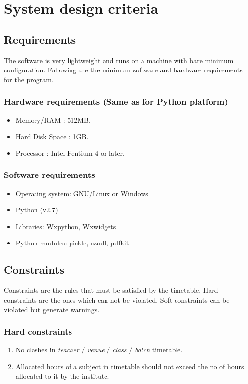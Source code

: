 %

\chapter{System design criteria}
\section{Requirements}
The software is very lightweight and runs on a machine with bare minimum configuration. Following are the minimum software and hardware requirements for the program.
\subsection{Hardware requirements (Same as for Python platform)}
\begin{itemize}
\item Memory/RAM : 512MB.
\item Hard Disk Space : 1GB.
\item Processor : Intel Pentium 4 or later.
\end{itemize}

\subsection{Software requirements}
\begin{itemize}
\item Operating system: GNU/Linux or Windows
\item Python (v2.7)
\item Libraries: Wxpython, Wxwidgets
\item Python modules: pickle, ezodf, pdfkit
\end{itemize}

\section{Constraints}
Constraints are the rules that must be satisfied by the timetable. Hard constraints are the ones which can not be violated. Soft constraints can be violated but generate warnings.
\subsection{Hard constraints}
\begin{enumerate}
\item No clashes in \textit{teacher} / \textit{venue} / \textit{class} / \textit{batch} timetable.
\item Allocated hours of a subject in timetable should not exceed the no of hours allocated to it by the institute.
\end{enumerate}

